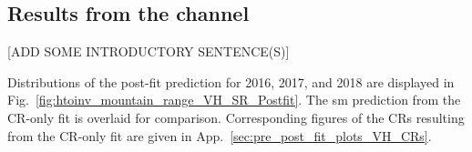 

\subsection{Results from the \texorpdfstring{\VH}{VH} channel}
\label{subsec:htoinv_analysis_VH}

[ADD SOME INTRODUCTORY SENTENCE(S)]

Distributions of the post-fit prediction for 2016, 2017, and 2018 are displayed in Fig.~\ref{fig:htoinv_mountain_range_VH_SR_Postfit}. The \acrshort{sm} prediction from the \gls{CR}-only fit is overlaid for comparison. Corresponding figures of the \glspl{CR} resulting from the \gls{CR}-only fit are given in App.~\ref{sec:pre_post_fit_plots_VH_CRs}.

